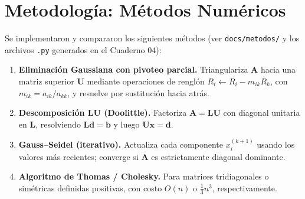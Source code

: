 \section{Metodología: Métodos Numéricos}
\label{sec:metodologia}

Se implementaron y compararon los siguientes métodos (ver \texttt{docs/metodos/} y los
archivos \texttt{.py} generados en el Cuaderno 04):

\begin{enumerate}
	\item \textbf{Eliminación Gaussiana con pivoteo parcial.} Triangulariza $\mathbf{A}$
	hacia una matriz superior $\mathbf{U}$ mediante operaciones de renglón
	$R_i \leftarrow R_i - m_{ik}R_k$, con $m_{ik}=a_{ik}/a_{kk}$, y resuelve por
	sustitución hacia atrás.
	\item \textbf{Descomposición LU (Doolittle).} Factoriza $\mathbf{A}=\mathbf{L}\mathbf{U}$
	con diagonal unitaria en $\mathbf{L}$, resolviendo $\mathbf{L}\mathbf{d}=\mathbf{b}$ y
	luego $\mathbf{U}\mathbf{x}=\mathbf{d}$.
	\item \textbf{Gauss--Seidel (iterativo).} Actualiza cada componente
	$x_i^{(k+1)}$ usando los valores más recientes; converge si $\mathbf{A}$ es
	estrictamente diagonal dominante.
	\item \textbf{Algoritmo de Thomas / Cholesky.} Para matrices tridiagonales o
	simétricas definidas positivas, con costo $O(n)$ o $\tfrac{1}{3}n^3$, respectivamente.
\end{enumerate}


